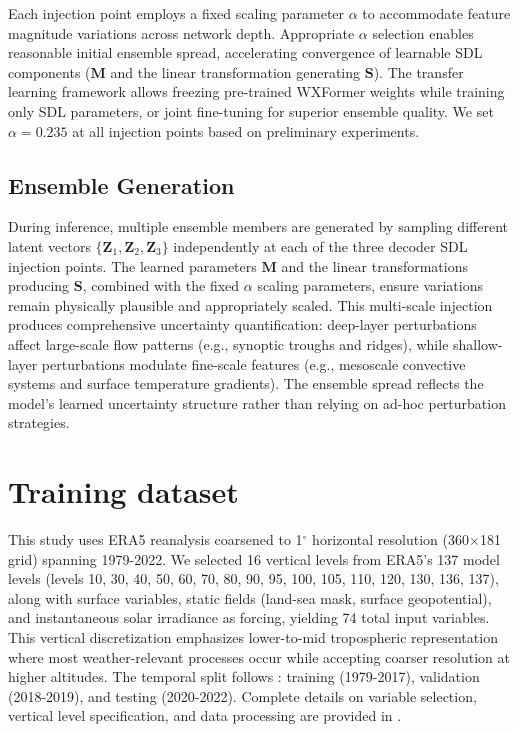 \documentclass{agujournal2019}
\begin{document}
Each injection point employs a fixed scaling parameter $\alpha$ to accommodate feature magnitude variations across network depth. Appropriate $\alpha$ selection enables reasonable initial ensemble spread, accelerating convergence of learnable SDL components ($\mathbf{M}$ and the linear transformation generating $\mathbf{S}$). The transfer learning framework allows freezing pre-trained WXFormer weights while training only SDL parameters, or joint fine-tuning for superior ensemble quality. We set $\alpha = 0.235$ at all injection points based on preliminary experiments.

\subsection{Ensemble Generation}
During inference, multiple ensemble members are generated by sampling different latent vectors $\{\mathbf{Z}_1, \mathbf{Z}_2, \mathbf{Z}_3\}$ independently at each of the three decoder SDL injection points. The learned parameters $\mathbf{M}$ and the linear transformations producing $\mathbf{S}$, combined with the fixed $\alpha$ scaling parameters, ensure variations remain physically plausible and appropriately scaled. This multi-scale injection produces comprehensive uncertainty quantification: deep-layer perturbations affect large-scale flow patterns (e.g., synoptic troughs and ridges), while shallow-layer perturbations modulate fine-scale features (e.g., mesoscale convective systems and surface temperature gradients). The ensemble spread reflects the model's learned uncertainty structure rather than relying on ad-hoc perturbation strategies.

\section{Training dataset}
This study uses ERA5 reanalysis \cite{hersbach2020era5} coarsened to 1$^\circ$ horizontal resolution (360$\times$181 grid) spanning 1979-2022. We selected 16 vertical levels from ERA5's 137 model levels (levels 10, 30, 40, 50, 60, 70, 80, 90, 95, 100, 105, 110, 120, 130, 136, 137), along with surface variables, static fields (land-sea mask, surface geopotential), and instantaneous solar irradiance as forcing, yielding 74 total input variables. This vertical discretization emphasizes lower-to-mid tropospheric representation where most weather-relevant processes occur while accepting coarser resolution at higher altitudes. The temporal split follows \cite{schreck2025}: training (1979-2017), validation (2018-2019), and testing (2020-2022). Complete details on variable selection, vertical level specification, and data processing are provided in \cite{schreck2025, sha2025terrain}.
\end{document}
